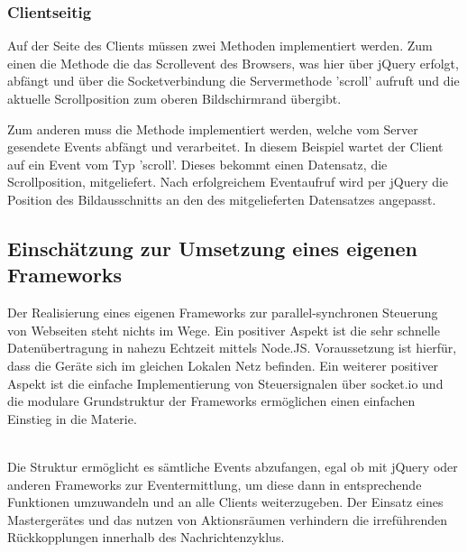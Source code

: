 	\subsubsection{Clientseitig}
	Auf der Seite des Clients müssen zwei Methoden implementiert werden. Zum einen die Methode die das Scrollevent des Browsers, was hier über jQuery erfolgt, abfängt und über die Socketverbindung die Servermethode 'scroll' aufruft und die aktuelle Scrollposition zum oberen Bildschirmrand übergibt.
	
	
	Zum anderen muss die Methode implementiert werden, welche vom Server gesendete Events abfängt und verarbeitet. In diesem Beispiel wartet der Client auf ein Event vom Typ 'scroll'. Dieses bekommt einen Datensatz, die Scrollposition, mitgeliefert. Nach erfolgreichem Eventaufruf wird per jQuery die Position des Bildausschnitts an den des mitgelieferten Datensatzes angepasst.
	

	\subsection{Einschätzung zur Umsetzung eines eigenen Frameworks}
	Der Realisierung eines eigenen Frameworks zur parallel-synchronen Steuerung von Webseiten steht nichts im Wege. Ein positiver Aspekt ist die sehr schnelle Datenübertragung in nahezu Echtzeit mittels Node.JS. Voraussetzung ist hierfür, dass die Geräte sich im gleichen Lokalen Netz befinden. Ein weiterer positiver Aspekt ist die einfache Implementierung von Steuersignalen über socket.io und die modulare Grundstruktur der Frameworks ermöglichen einen einfachen Einstieg in die Materie.

\\Die Struktur ermöglicht es sämtliche Events abzufangen, egal ob mit jQuery oder anderen Frameworks zur Eventermittlung, um diese dann in entsprechende Funktionen umzuwandeln und an alle Clients weiterzugeben. Der Einsatz eines Mastergerätes und das nutzen von Aktionsräumen verhindern die irreführenden Rückkopplungen innerhalb des Nachrichtenzyklus. 

